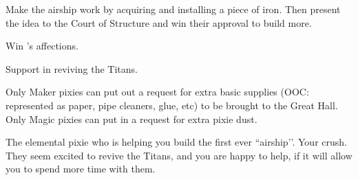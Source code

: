 \documentclass[char]{PP}
\begin{document}
\begin{itemz}
	\item Make the airship work by acquiring and installing a piece of iron. Then present the idea to the Court of Structure and win their approval to build more.
	\item Win \cETitan{}'s affections.
	\item Support \cETitan{} in reviving the Titans.
\end{itemz}

\begin{itemz}[Notes]
	\item Only Maker pixies can put out a request for extra basic supplies (OOC: represented as paper, pipe cleaners, glue, etc) to be brought to the Great Hall. Only Magic pixies can put in a request for extra pixie dust.
\end{itemz}

\begin{contacts}
	\contact{\cEAirship{}} The elemental pixie who is helping you build the first ever ``airship’’.
	\contact{\cETitan{}} Your crush.  They seem excited to revive the Titans, and you are happy to help, if it will allow you to spend more time with them.
\end{contacts}
\end{document}
